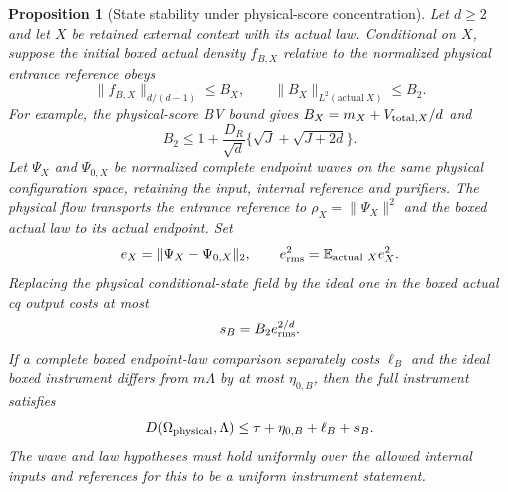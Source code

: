 \documentclass[11pt]{article}
\numberwithin{equation}{section}
\newtheorem{proposition}[theorem]{Proposition}
\theoremstyle{definition}
\theoremstyle{remark}
\begin{document}
\begin{proposition}[State stability under physical-score concentration]
\label{p1i:prop:capfreestate}
Let $d\geq2$ and let $X$ be retained external context with its actual
law. Conditional on $X$, suppose the initial boxed actual density
$f_{B,X}$ relative to the normalized physical entrance reference obeys
\[
 \|f_{B,X}\|_{d/(d-1)}\leq B_X,
 \qquad\|B_X\|_{L^2(\mathrm{actual}\ X)}\leq B_2.
\]
For example, the physical-score BV bound gives
$B_X=m_X+V_{{\rm total},X}/d$ and
\[
 B_2\leq1+\frac{D_R}{\sqrt d}
                  \{\sqrt J+\sqrt{J+2d}\}.
\]
Let $\Psi_X$ and $\Psi_{0,X}$ be normalized complete endpoint waves on
the same physical configuration space, retaining the input, internal
reference and purifiers. The physical flow transports the entrance
reference to $\rho_X=\|\Psi_X\|^2$ and the boxed actual law to its actual
endpoint. Set
\[
 e_X=\|\Psi_X-\Psi_{0,X}\|_2,
 \qquad e_{\rm rms}^2=\mathbb E_{\mathrm{actual}\ X} e_X^2.
\]
Replacing the physical conditional-state field by the ideal one in the
boxed actual cq output costs at most
\begin{equation}\label{p1i:eq:capfreestate}
 s_B=B_2 e_{\rm rms}^{2/d}.
\end{equation}
If a complete boxed endpoint-law comparison separately costs $\ell_B$
and the ideal boxed instrument differs from $m\Lambda$ by at most
$\eta_{0,B}$, then the full instrument satisfies
\begin{equation}\label{p1i:eq:physicalcomposition}
 D(\Omega_{\rm physical},\Lambda)
                   \leq\tau+\eta_{0,B}+\ell_B+s_B.
\end{equation}
The wave and law hypotheses must hold uniformly over the allowed
internal inputs and references for this to be a uniform instrument
statement.
\end{proposition}
\end{document}
